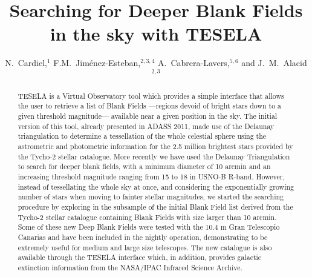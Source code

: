 
\resetcounters





\title{Searching for Deeper Blank Fields in the sky with TESELA}
\author{N.~Cardiel,$^1$ F.M.~Jim\'{e}nez-Esteban,$^{2,3,4}$
A.~Cabrera-Lavers,$^{5,6}$ and J.~M.~Alacid$^{2,3}$
}


\begin{abstract}
TESELA is a Virtual Observatory tool which provides a simple interface that
allows the user to retrieve a list of Blank Fields ---regions devoid of bright
stars down to a given threshold magnitude--- available near a given position in
the sky. The initial version of this tool, already presented in ADASS 2011,
made use of the Delaunay triangulation to determine a tessellation of the whole
celestial sphere using the astrometric and photometric information for the 2.5
million brightest stars provided by the Tycho-2 stellar catalogue. More
recently we have used the Delaunay Triangulation to search for deeper blank
fields, with a minimum diameter of 10 arcmin and an increasing threshold
magnitude ranging from 15 to 18 in USNO-B R-band. However, instead of
tessellating the whole sky at once, and considering the exponentially growing
number of stars when moving to fainter stellar magnitudes, we started the
searching procedure by exploring in the subsample of the initial Blank Field
list derived from the Tycho-2 stellar catalogue containing Blank Fields with
size larger than 10 arcmin. Some of these new Deep Blank Fields were
tested with the 10.4 m Gran Telescopio Canarias and have been included in the
nightly operation, demonstrating to be extremely
useful for medium and large size telescopes. The new catalogue is also
available through the TESELA interface which, in addition, provides galactic
extinction information from the NASA/IPAC Infrared Science Archive. 
\end{abstract}

